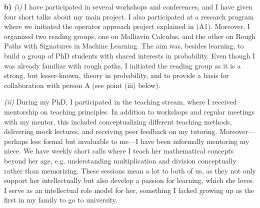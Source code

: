 \documentclass[./Research_statement.tex]{subfiles}
\begin{document}
\vspace{2pt}

\noindent \textbf{b)} \textit{(i)}
I have participated in several workshops and conferences, and I have given four short talks about my main project. I also participated at a research program where we initiated the operator approach project explained in (A1). Moreover, I organized two reading groups, one on Malliavin Calculus, and the other on Rough Paths with Signatures in Machine Learning. The aim was, besides learning, to build a group of PhD students with shared interests in probability. Even though I was already familiar with rough paths, I initiated the reading group as it is a strong, but lesser-known, theory in probability, and to provide a basis for collaboration with person A (see point (iii) below).


\vspace{2pt}

\noindent \textit{(ii)}  During my PhD, I participated in the teaching stream, where I received mentorship on teaching principles. In addition to workshops and regular meetings with my mentor, this included conceptualizing different teaching methods, delivering mock lectures, and receiving peer feedback on my tutoring. Moreover---perhaps less formal but invaluable to me---I have been informally mentoring my niece. We have weekly short calls where I teach her mathematical concepts beyond her age, e.g. understanding multiplication and division conceptually rather than memorizing. These sessions mean a lot to both of us, as they not only support her intellectually but also develop a passion for learning, which she loves. I serve as an intellectual role model for her, something I lacked growing up as the first in my family to go to university.


\vspace{2pt}
\end{document}
